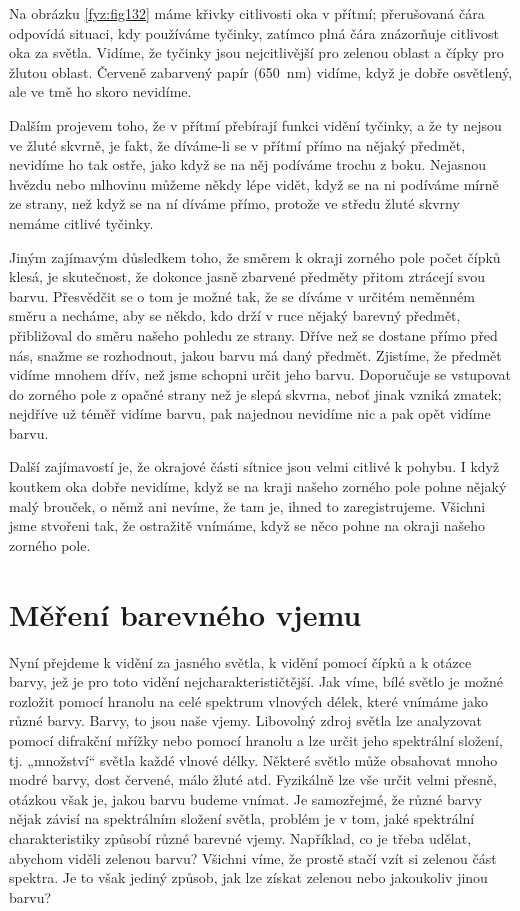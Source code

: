     Na obrázku \ref{fyz:fig132} máme křivky citlivosti oka v přítmí; přerušovaná čára odpovídá 
    situaci, kdy používáme tyčinky, zatímco plná čára znázorňuje citlivost oka za světla. Vidíme, 
    že tyčinky jsou nejcitlivější pro zelenou oblast a čípky pro žlutou oblast. Červeně zabarvený 
    papír (\SI{650}{\nm}) vidíme, když je dobře osvětlený, ale ve tmě ho skoro nevidíme.
    
    Dalším projevem toho, že v přítmí přebírají funkci vidění tyčinky, a že ty nejsou ve žluté 
    skvrně, je fakt, že díváme-li se v přítmí přímo na nějaký předmět, nevidíme ho tak ostře, jako 
    když se na něj podíváme trochu z boku. Nejasnou hvězdu nebo mlhovinu můžeme někdy lépe vidět, 
    když se na ni podíváme mírně ze strany, než když se na ní díváme přímo, protože ve středu žluté 
    skvrny nemáme citlivé tyčinky.
    
    Jiným zajímavým důsledkem toho, že směrem k okraji zorného pole počet čípků klesá, je 
    skutečnost, že dokonce jasně zbarvené předměty přitom ztrácejí svou barvu. Přesvědčit se o tom 
    je možné tak, že se díváme v určitém neměnném směru a necháme, aby se někdo, kdo drží v ruce 
    nějaký barevný předmět, přibližoval do směru našeho pohledu ze strany. Dříve než se dostane 
    přímo před nás, snažme se rozhodnout, jakou barvu má daný předmět. Zjistíme, že předmět vidíme 
    mnohem dřív, než jsme schopni určit jeho barvu. Doporučuje se vstupovat do zorného pole z 
    opačné strany než je slepá skvrna, neboť jinak vzniká zmatek; nejdříve už téměř vidíme barvu, 
    pak najednou nevidíme nic a pak opět vidíme barvu.
    
    Další zajímavostí je, že okrajové části sítnice jsou velmi citlivé k pohybu. I když koutkem oka 
    dobře nevidíme, když se na kraji našeho zorného pole pohne nějaký malý brouček, o němž ani 
    nevíme, že tam je, ihned to zaregistrujeme. Všichni jsme stvořeni tak, že ostražitě vnímáme, 
    když se něco pohne na okraji našeho zorného pole.
    
  \section{Měření barevného vjemu}\label{fyz:IchapXXXVsecIII}
    Nyní přejdeme k vidění za jasného světla, k vidění pomocí čípků a k otázce barvy, jež je pro 
    toto vidění nejcharakterističtější. Jak víme, bílé světlo je možné rozložit pomocí hranolu na 
    celé spektrum vlnových délek, které vnímáme jako různé barvy. Barvy, to jsou naše vjemy. 
    Libovolný zdroj světla lze analyzovat pomocí difrakční mřížky nebo pomocí hranolu a lze určit 
    jeho spektrální složení, tj. „množství“ světla každé vlnové délky. Některé světlo může 
    obsahovat mnoho modré barvy, dost červené, málo žluté atd. Fyzikálně lze vše určit velmi 
    přesně, otázkou však je, jakou barvu budeme vnímat. Je samozřejmé, že různé barvy nějak závisí 
    na spektrálním složení světla, problém je v tom, jaké spektrální charakteristiky způsobí různé 
    barevné vjemy. Například, co je třeba udělat, abychom viděli zelenou barvu? Všichni víme, že 
    prostě stačí vzít si zelenou část spektra. Je to však jediný způsob, jak lze získat zelenou 
    nebo jakoukoliv jinou barvu?
    
